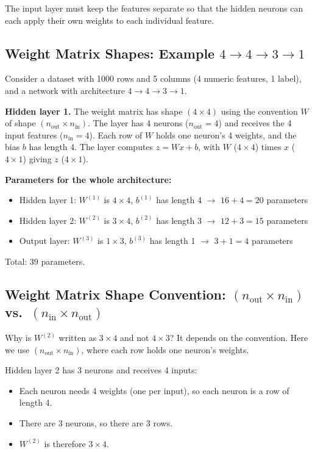 The input layer must keep the features separate so that the hidden neurons can each apply their own weights to each individual feature.

\subsection*{Weight Matrix Shapes: Example $4 \to 4 \to 3 \to 1$}

Consider a dataset with 1000 rows and 5 columns (4 numeric features, 1 label), and a network with architecture $4 \to 4 \to 3 \to 1$.

\textbf{Hidden layer 1.} The weight matrix has shape $(4 \times 4)$ using the convention $W$ of shape $(n_{\text{out}} \times n_{\text{in}})$. The layer has 4 neurons ($n_{\text{out}} = 4$) and receives the 4 input features ($n_{\text{in}} = 4$). Each row of $W$ holds one neuron's 4 weights, and the bias $b$ has length 4. The layer computes $z = Wx + b$, with $W$ ($4 \times 4$) times $x$ ($4 \times 1$) giving $z$ ($4 \times 1$).

\textbf{Parameters for the whole architecture:}
\begin{itemize}
    \item Hidden layer 1: $W^{(1)}$ is $4 \times 4$, $b^{(1)}$ has length 4 $\to$ $16 + 4 = 20$ parameters
    \item Hidden layer 2: $W^{(2)}$ is $3 \times 4$, $b^{(2)}$ has length 3 $\to$ $12 + 3 = 15$ parameters
    \item Output layer: $W^{(3)}$ is $1 \times 3$, $b^{(3)}$ has length 1 $\to$ $3 + 1 = 4$ parameters
\end{itemize}
Total: 39 parameters.

\subsection*{Weight Matrix Shape Convention: $(n_{\text{out}} \times n_{\text{in}})$ vs.\ $(n_{\text{in}} \times n_{\text{out}})$}

Why is $W^{(2)}$ written as $3 \times 4$ and not $4 \times 3$? It depends on the convention. Here we use $(n_{\text{out}} \times n_{\text{in}})$, where each row holds one neuron's weights.

Hidden layer 2 has 3 neurons and receives 4 inputs:
\begin{itemize}
    \item Each neuron needs 4 weights (one per input), so each neuron is a row of length 4.
    \item There are 3 neurons, so there are 3 rows.
    \item $W^{(2)}$ is therefore $3 \times 4$.
\end{itemize}

